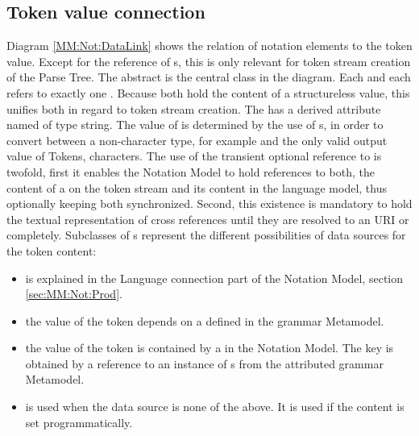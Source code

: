 \subsection{Token value connection} \label{ss:tokenValCon}
Diagram \ref{MM:Not:DataLink} shows the relation of notation elements to the token value. Except for the  reference of s, this is only relevant for token stream creation of the Parse Tree. The abstract  is the central class in the diagram. Each  and each  refers to exactly one . Because both hold the content of a structureless value, this unifies both in regard to token stream creation. The  has a derived attribute named  of type string. The value of  is determined by the use of s, in order to convert between a non-character type, for example  and the only valid output value of Tokens, characters. The use of the transient optional reference to  is twofold, first it enables the Notation Model to hold references to both, the content of a  on the token stream and its content in the language model, thus optionally keeping both synchronized. Second, this existence is mandatory to hold the textual representation of cross references until they are resolved to an URI or completely. Subclasses of s represent the different possibilities of data sources for the token content:
\begin{itemize}
	\item {} is explained in the Language connection part of the Notation Model, section \ref{sec:MM:Not:Prod}.
	\item {} the value of the token depends on a   defined in the grammar Metamodel.
	\item {} the value of the token is contained by a  in the Notation Model. The key is obtained by a reference to an instance of s from the attributed grammar Metamodel.
	\item {} is used when the data source is none of the above. It is used if the content is set programmatically.
\end{itemize}


